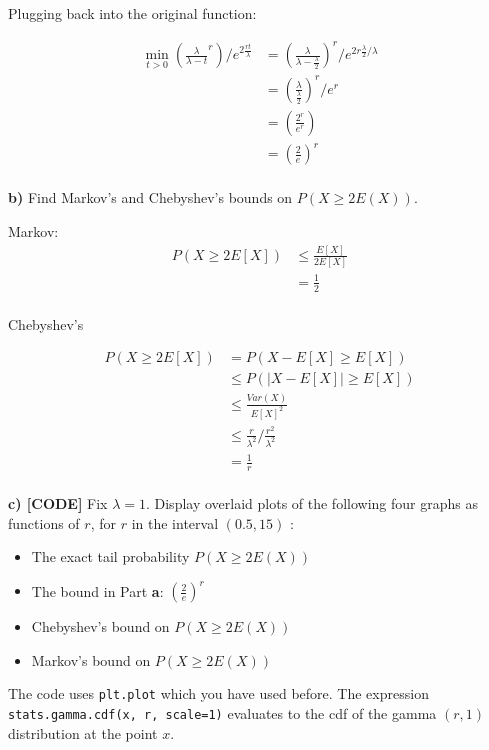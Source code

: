 \documentclass[11pt]{article}
\providecommand{\tightlist}{%
      \setlength{\itemsep}{0pt}\setlength{\parskip}{0pt}}
\begin{document}
Plugging back into the original function:

\begin{align*}
	\min_{t>0} \left( \frac{\lambda}{\lambda-t}^{r} \right) / e^{2 \frac{rt}{\lambda}} &= \left( \frac{\lambda}{\lambda - \frac{\lambda}{2}} \right)^{r} / e^{2 r \frac{\lambda}{2} / \lambda} \\
	&= \left( \frac{\lambda}{\frac{\lambda}{2}} \right) ^{r} / e^{r} \\
	&= \left( \frac{2^{r}}{e^{r}} \right)  \\
	&= \left( \frac{2}{e} \right) ^{r} \\
\end{align*}


\textbf{b)} Find Markov's and Chebyshev's bounds on \(P(X \ge 2E(X))\).


Markov:
\begin{align*}
	P(X \ge 2E[X]) &\le \frac{E[X]}{2E[X]}\\
	&= \frac{1}{2} \\
\end{align*}

Chebyshev's

\begin{align*}
	P(X \ge 2E[X]) &= P(X - E[X] \ge E[X]) \\
		       &\le P(\vert X - E[X] \vert \ge E[X]) \\
		       &\le \frac{Var(X)}{E[X]^{2}} \\ 
		       &\le \frac{r}{\lambda^{2}} / \frac{r^{2}}{\lambda^{2}}\\
		       &= \frac{1}{r} \\
\end{align*}


\textbf{c) {[}CODE{]}} Fix \(\lambda = 1\). Display overlaid plots of
the following four graphs as functions of \(r\), for \(r\) in the
interval \((0.5, 15)\) :

\begin{itemize}
\tightlist
\item
  The exact tail probability \(P(X \ge 2E(X))\)
\item
  The bound in Part \textbf{a}: \(\left(\frac{2}{e}\right)^r\)
\item
  Chebyshev's bound on \(P(X \ge 2E(X))\)
\item
  Markov's bound on \(P(X \ge 2E(X))\)
\end{itemize}

The code uses \texttt{plt.plot} which you have used before. The
expression \texttt{stats.gamma.cdf(x,\ r,\ scale=1)} evaluates to the
cdf of the gamma \((r, 1)\) distribution at the point \(x\).
\end{document}
